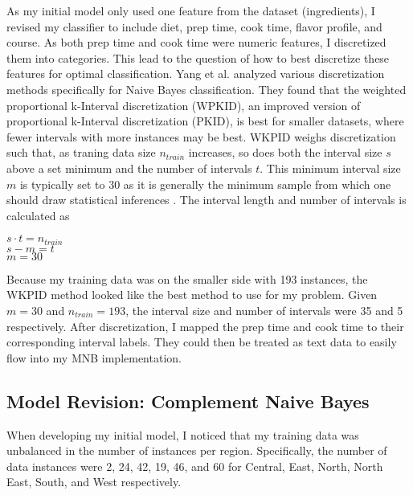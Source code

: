 \documentclass[12pt]{article}
\begin{document}
\noindent As my initial model only used one feature from the dataset (ingredients), I revised my classifier to include diet, prep time, cook time, flavor profile, and course. As both prep time and cook time were numeric features, I discretized them into categories. This lead to the question of how to best discretize these features for optimal classification. Yang et al.\cite{Yang} analyzed various discretization methods specifically for Naive Bayes classification.
They found that the weighted proportional k-Interval discretization (WPKID), an improved version of proportional k-Interval discretization (PKID), is best for smaller datasets, where fewer intervals with more instances may be best. WKPID weighs discretization such that, as traning data size $n_{train}$ increases, so does both the interval size $s$ above a set minimum and the number of intervals $t$. This minimum interval size $m$ is typically set to 30 as it is generally the minimum sample from which one should draw statistical inferences \cite{Yang}. The interval length and number of intervals is calculated as
\begin{center}
$s \cdot t = n_{train}$ \\
$s - m = t$ \\
$m = 30$ \\
\end{center}

\noindent Because my training data was on the smaller side with 193 instances, the WKPID method looked like the best method to use for my problem. Given $m = 30$ and $n_{train} = 193$, the interval size and number of intervals were 35 and 5 respectively. After discretization, I mapped the prep time and cook time to their corresponding interval labels. They could then be treated as text data to easily flow into my MNB implementation.

\subsection{Model Revision: Complement Naive Bayes}
When developing my initial model, I noticed that my training data was unbalanced in the number of instances per region. Specifically, the number of data instances were 2, 24, 42, 19, 46, and 60 for Central, East, North, North East, South, and West respectively. 
\end{document}
